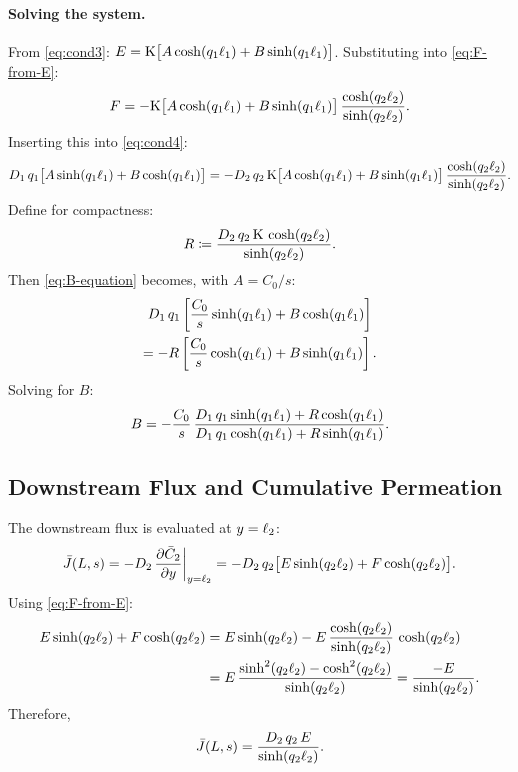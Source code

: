 \paragraph{Solving the system.}
From \cref{eq:cond3}: $E = \mathrm{K}\bigl[A\cosh(q_1\ell_{1}) + B\sinh(q_1\ell_{1})
\bigr]$.  Substituting into \cref{eq:F-from-E}:
\begin{equation}
  F = -\mathrm{K}\bigl[A\cosh(q_1\ell_{1}) + B\sinh(q_1\ell_{1})\bigr]\,
  \frac{\cosh(q_2\ell_{2})}{\sinh(q_2\ell_{2})}.
\end{equation}
Inserting this into \cref{eq:cond4}:
\begin{equation}
  \label{eq:B-equation}
  D_{1}\,q_1\bigl[A\sinh(q_1\ell_{1}) + B\cosh(q_1\ell_{1})\bigr]
  = -D_{2}\,q_2\,\mathrm{K}\bigl[A\cosh(q_1\ell_{1}) + B\sinh(q_1\ell_{1})\bigr]\,
  \frac{\cosh(q_2\ell_{2})}{\sinh(q_2\ell_{2})}.
\end{equation}
Define for compactness:
\begin{equation}
  \label{eq:R-def}
  R \coloneqq \frac{D_{2}\,q_2\,\mathrm{K}\,\cosh(q_2\ell_{2})}
  {\sinh(q_2\ell_{2})}.
\end{equation}
Then \cref{eq:B-equation} becomes, with $A = C_0/s$:
\begin{multline}
  D_{1}\,q_1\left[\frac{C_0}{s}\sinh(q_1\ell_{1})
    + B\cosh(q_1\ell_{1})\right] \\
  = -R\left[\frac{C_0}{s}\cosh(q_1\ell_{1})
    + B\sinh(q_1\ell_{1})\right].
\end{multline}
Solving for $B$:
\begin{equation}
  \label{eq:B-solved}
  B = -\frac{C_0}{s}\,
  \frac{D_{1}\,q_1\sinh(q_1\ell_{1}) + R\cosh(q_1\ell_{1})}
  {D_{1}\,q_1\cosh(q_1\ell_{1}) + R\sinh(q_1\ell_{1})}.
\end{equation}

\subsection{Downstream Flux and Cumulative Permeation}
\label{sec:two-layer-flux}

The downstream flux is evaluated at $y = \ell_{2}$:
\begin{equation}
  \bar{J}(L,s) = -D_{2}\,\pdv{\bar{C}_2}{y}\bigg|_{y=\ell_{2}}
  = -D_{2}\,q_2\bigl[E\sinh(q_2\ell_{2}) + F\cosh(q_2\ell_{2})\bigr].
\end{equation}
Using \cref{eq:F-from-E}:
\begin{align}
  E\sinh(q_2\ell_{2}) + F\cosh(q_2\ell_{2})
  &= E\sinh(q_2\ell_{2})
    - E\,\frac{\cosh(q_2\ell_{2})}{\sinh(q_2\ell_{2})}\,\cosh(q_2\ell_{2})
  \notag\\
  &= E\,\frac{\sinh^2(q_2\ell_{2}) - \cosh^2(q_2\ell_{2})}{\sinh(q_2\ell_{2})}
  = \frac{-E}{\sinh(q_2\ell_{2})}.
\end{align}
Therefore,
\begin{equation}
  \label{eq:Jbar-downstream}
  \bar{J}(L,s) = \frac{D_{2}\,q_2\,E}{\sinh(q_2\ell_{2})}.
\end{equation}

